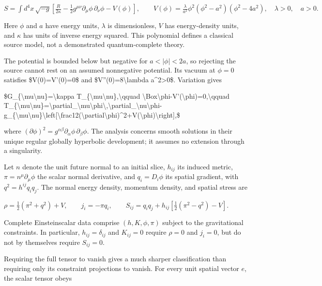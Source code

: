 \documentclass[11pt]{article}
\begin{document}
$S=\int d^4x\,\sqrt{-g}\left[\frac{R}{2\kappa}-\frac12 g^{\mu\nu}\partial_\mu\phi\,\partial_\nu\phi-V(\phi)\right],\qquad V(\phi)=\frac{\lambda}{a^2}\phi^2(\phi^2-a^2)(\phi^2-4a^2),\quad \lambda>0,\quad a>0.$

Here $\phi$ and $a$ have energy units, $\lambda$ is dimensionless, $V$ has energy-density units, and $\kappa$ has units of inverse energy squared. This polynomial defines a classical source model, not a demonstrated quantum-complete theory.

The potential is bounded below but negative for $a<|\phi|<2a$, so rejecting the source cannot rest on an assumed nonnegative potential. Its vacuum at $\phi=0$ satisfies \$V(0)=V'(0)=0\$ and \$V''(0)=8\textbackslash{}lambda a\textasciicircum{}2\textgreater{}0\$. Variation gives

\$G\_\{\textbackslash{}mu\textbackslash{}nu\}=\textbackslash{}kappa T\_\{\textbackslash{}mu\textbackslash{}nu\},\textbackslash{}qquad \textbackslash{}Box\textbackslash{}phi-V'(\textbackslash{}phi)=0,\textbackslash{}qquad T\_\{\textbackslash{}mu\textbackslash{}nu\}=\textbackslash{}partial\_\textbackslash{}mu\textbackslash{}phi\textbackslash{},\textbackslash{}partial\_\textbackslash{}nu\textbackslash{}phi-g\_\{\textbackslash{}mu\textbackslash{}nu\}\textbackslash{}left[\textbackslash{}frac12(\textbackslash{}partial\textbackslash{}phi)\textasciicircum{}2+V(\textbackslash{}phi)\textbackslash{}right],\$

where $(\partial\phi)^2=g^{\alpha\beta}\partial_\alpha\phi\,\partial_\beta\phi$. The analysis concerns smooth solutions in their unique regular globally hyperbolic development; it assumes no extension through a singularity.

Let $n$ denote the unit future normal to an initial slice, $h_{ij}$ its induced metric, $\pi=n^\mu\partial_\mu\phi$ the scalar normal derivative, and $q_i=D_i\phi$ its spatial gradient, with $q^2=h^{ij}q_iq_j$. The normal energy density, momentum density, and spatial stress are

$\rho=\frac12(\pi^2+q^2)+V,\qquad j_i=-\pi q_i,\qquad S_{ij}=q_iq_j+h_{ij}\left[\frac12(\pi^2-q^2)-V\right].$

Complete Einstein\textendash{}scalar data comprise $(h,K,\phi,\pi)$ subject to the gravitational constraints. In particular, $h_{ij}=\delta_{ij}$ and $K_{ij}=0$ require $\rho=0$ and $j_i=0$, but do not by themselves require $S_{ij}=0$.

Requiring the full tensor to vanish gives a much sharper classification than requiring only its constraint projections to vanish. For every unit spatial vector $e$, the scalar tensor obeys
\end{document}
